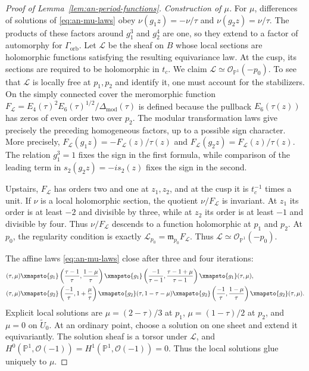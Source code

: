 \documentclass[11pt]{article}
\theoremstyle{definition}
\theoremstyle{remark}
\numberwithin{equation}{section}
\newcommand{\PP}{\mathbb P}
\newcommand{\cO}{\mathcal O}
\begin{document}
\begin{proof}[Proof of Lemma~\ref{lem:an-period-functions}]
\smallskip
\noindent\emph{Construction of $\mu$.}
For $\mu$, differences of solutions
of \eqref{eq:an-mu-laws} obey $\nu(g_1z)=-\nu/\tau$ and
$\nu(g_2z)=\nu/\tau$.
The products of these factors around $g_1^3$ and $g_2^4$ are one, so
they extend to a factor of automorphy for $\Gamma_{\mathrm{orb}}$.  Let
$\mathcal L$ be the sheaf on $B$ whose local sections are holomorphic
functions satisfying the resulting equivariance law.  At the cusp, its
sections are required to be holomorphic in $t_c$.  We claim
$\mathcal L\simeq\cO_{\PP^1}(-p_0)$.
To see that $\mathcal L$ is locally free at $p_1,p_2$ and identify it,
one must account for the stabilizers.  On the simply connected cover the
meromorphic function
$F_{\mathcal L}=E_4(\tau)^2E_6(\tau)^{1/2}/
\Delta_{\mathrm{mod}}(\tau)$
is defined because the pullback $E_6(\tau(z))$ has zeros of even order
two over $p_2$.  The modular transformation laws give precisely the
preceding homogeneous factors, up to a possible sign character.  More
precisely, $F_{\mathcal L}(g_1z)=-F_{\mathcal L}(z)/\tau(z)$ and
$F_{\mathcal L}(g_2z)=F_{\mathcal L}(z)/\tau(z)$.
The relation $g_1^3=1$ fixes the sign in the first formula, while comparison
of the leading term in $s_2(g_2z)=-is_2(z)$ fixes the sign in the second.

Upstairs, $F_{\mathcal L}$ has orders two and one at $z_1,z_2$, and
at the cusp it is $t_c^{-1}$ times a unit.  If $\nu$ is a local
holomorphic section, the quotient $\nu/F_{\mathcal L}$ is invariant.  At
$z_1$ its order is at least $-2$ and divisible by three, while at
$z_2$ its order is at least $-1$ and divisible by four.  Thus
$\nu/F_{\mathcal L}$ descends to a function holomorphic at $p_1$ and
$p_2$.  At $p_0$, the
regularity condition is exactly
$\mathcal L_{p_0}=\mathfrak m_{p_0}F_{\mathcal L}$.  Thus
$\mathcal L\simeq\cO_{\PP^1}(-p_0)$.

The affine laws \eqref{eq:an-mu-laws} close after three and four
iterations:
\[
\begin{aligned}
(\tau,\mu)&\xmapsto{g_1}
 \left(\frac{\tau-1}{\tau},\frac{1-\mu}{\tau}\right)
 \xmapsto{g_1}
 \left(\frac{-1}{\tau-1},\frac{\tau-1+\mu}{\tau-1}\right)
 \xmapsto{g_1}(\tau,\mu),\\
(\tau,\mu)&\xmapsto{g_2}
 \left(\frac{-1}{\tau},1+\frac\mu\tau\right)
 \xmapsto{g_2}(\tau,1-\tau-\mu)
 \xmapsto{g_2}
 \left(\frac{-1}{\tau},\frac{1-\mu}{\tau}\right)
 \xmapsto{g_2}(\tau,\mu).
\end{aligned}
\]
Explicit local solutions are $\mu=(2-\tau)/3$ at $p_1$,
$\mu=(1-\tau)/2$ at $p_2$, and $\mu=0$ on $\widetilde U_0$.
At an ordinary point, choose a solution on one sheet and extend it
equivariantly.  The solution sheaf is a torsor under $\mathcal L$, and
$H^0(\PP^1,\cO(-1))=H^1(\PP^1,\cO(-1))=0$.
Thus the local solutions glue uniquely to $\mu$.


\end{proof}
\end{document}
